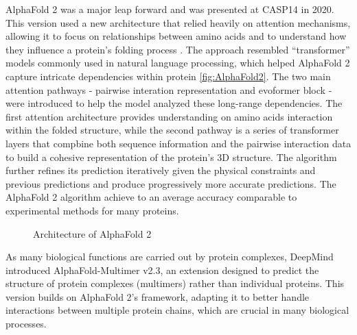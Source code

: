 \documentclass{article}
\begin{document}
AlphaFold 2 was a major leap forward and was presented at CASP14 in 2020. This version used a new architecture that relied heavily on attention mechanisms, allowing it to focus on relationships between amino acids and to understand how they influence a protein’s folding process \cite{jumper_highly_2021}. The approach resembled “transformer” models commonly used in natural language processing, which helped AlphaFold 2 capture intricate dependencies within protein \autoref{fig:AlphaFold2}. The two main attention pathways - pairwise interation representation and evoformer block - were introduced to help the model analyzed these long-range dependencies. The first attention architecture provides understanding on amino acids interaction within the folded structure, while the second pathway is a series of transformer layers that compbine both sequence information and the pairwise interaction data to build a cohesive representation of the protein's 3D structure. The algorithm further refines its prediction iteratively given the physical constraints and previous predictions and produce progressively more accurate predictions. The AlphaFold 2 algorithm achieve to an average accuracy comparable to experimental methods for many proteins.

\begin{figure}[h]
    \caption{Architecture of AlphaFold 2} 
    \label{fig:AlphaFold2}
\end{figure}


As many biological functions are carried out by protein complexes, DeepMind introduced AlphaFold-Multimer v2.3, an extension designed to predict the structure of protein complexes (multimers) rather than individual proteins. This version builds on AlphaFold 2’s framework, adapting it to better handle interactions between multiple protein chains, which are crucial in many biological processes.
\end{document}
